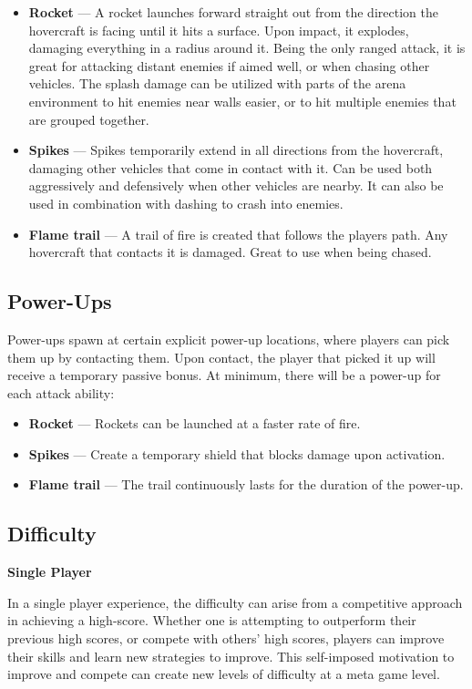 \documentclass{article}
\theoremstyle{definition}
\begin{document}
\begin{itemize}
  \item \textbf{Rocket} --- A rocket launches forward straight out from the
    direction the hovercraft is facing until it hits a surface. Upon impact, it
    explodes, damaging everything in a radius around it. Being the only ranged
    attack, it is great for attacking distant enemies if aimed well, or when
    chasing other vehicles. The splash damage can be utilized with parts of the
    arena environment to hit enemies near walls easier, or to hit multiple
    enemies that are grouped together.
  \item \textbf{Spikes} --- Spikes temporarily extend in all directions from
    the hovercraft, damaging other vehicles that come in contact with it. Can
    be used both aggressively and defensively when other vehicles are nearby.
    It can also be used in combination with dashing to crash into enemies.
  \item \textbf{Flame trail} --- A trail of fire is created that follows the
    players path. Any hovercraft that contacts it is damaged. Great to use when
    being chased.
\end{itemize}


\subsection{Power-Ups}

Power-ups spawn at certain explicit power-up locations, where players can pick
them up by contacting them. Upon contact, the player that picked it up will
receive a temporary passive bonus. At minimum, there will be a power-up for
each attack ability:
\begin{itemize}
  \item \textbf{Rocket} --- Rockets can be launched at a faster rate of fire.
  \item \textbf{Spikes} --- Create a temporary shield that blocks damage upon
    activation.
  \item \textbf{Flame trail} --- The trail continuously lasts for the duration
    of the power-up.
\end{itemize}

\subsection{Difficulty}

\textbf{Single Player}

In a single player experience, the difficulty can arise
from a competitive approach in achieving a high-score. Whether one is
attempting to outperform their previous high scores, or compete with others'
high scores, players can improve their skills and learn new strategies to
improve. This self-imposed motivation to improve and compete can create new
levels of difficulty at a meta game level.
\end{document}
